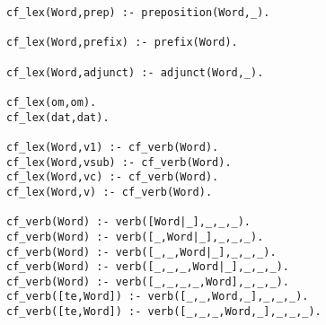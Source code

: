 \begin{verbatim}
cf_lex(Word,prep) :- preposition(Word,_).

cf_lex(Word,prefix) :- prefix(Word).

cf_lex(Word,adjunct) :- adjunct(Word,_).

cf_lex(om,om).
cf_lex(dat,dat).

cf_lex(Word,v1) :- cf_verb(Word).
cf_lex(Word,vsub) :- cf_verb(Word).
cf_lex(Word,vc) :- cf_verb(Word).
cf_lex(Word,v) :- cf_verb(Word).

cf_verb(Word) :- verb([Word|_],_,_,_).
cf_verb(Word) :- verb([_,Word|_],_,_,_).
cf_verb(Word) :- verb([_,_,Word|_],_,_,_).
cf_verb(Word) :- verb([_,_,_,Word|_],_,_,_).
cf_verb(Word) :- verb([_,_,_,_,Word],_,_,_).
cf_verb([te,Word]) :- verb([_,_,Word,_],_,_,_).
cf_verb([te,Word]) :- verb([_,_,_,Word,_],_,_,_).


\end{verbatim}
